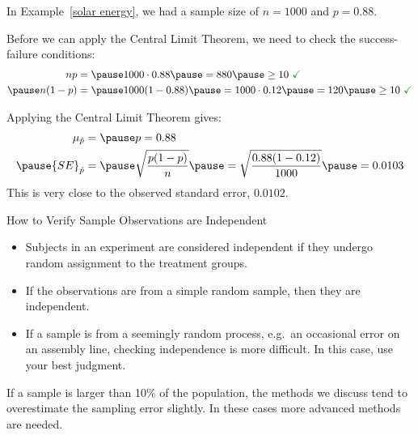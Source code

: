 \documentclass{beamer}
\begin{document}
\begin{frame}
  \begin{example}\label{solar CLT}
    \vspace{-2mm}%
    In Example~\ref{solar energy}, we had a sample size of $n=1000$ and $p=0.88$.\pause

    \vspace{1mm}
    Before we can apply the Central Limit Theorem, we need to check the success-failure conditions:
    \begin{equation*}
      \begin{aligned}
        np &= \pause
        1000\cdot 0.88\pause
        = 880\pause
        \geq 10~{\color{green!70!black}\checkmark} \\\pause
        n(1-p) &= \pause
        1000(1-0.88)\pause
        = 1000\cdot 0.12\pause
        = 120\pause
        \geq 10~{\color{green!70!black}\checkmark}
      \end{aligned}
    \end{equation*}\pause

    Applying the Central Limit Theorem gives:
    \begin{equation*}
      \begin{aligned}
        \mu_{\hat{p}} &=\pause
        p = 0.88 \\\pause
        {SE}_{\hat{p}} &= \pause
        \sqrt{\dfrac{p(1-p)}{n}}\pause
        = \sqrt{\dfrac{0.88(1-0.12)}{1000}}\pause
        = 0.0103
      \end{aligned}
    \end{equation*}\pause
    This is very close to the observed standard error, $0.0102$.
  \end{example}
\end{frame}

\begin{frame}
  \begin{block}{How to Verify Sample Observations are Independent}
    \begin{itemize}
    \item Subjects in an experiment are considered independent if they undergo random assignment to the treatment groups.\pause
    \item If the observations are from a simple random sample, then they are independent.\pause
    \item If a sample is from a seemingly random process, e.g.\  an occasional error on an assembly line, checking independence is more difficult. In this case, use your best judgment.
    \end{itemize}
  \end{block}\pause

  \begin{note}
    If a sample is larger than 10\% of the population, the methods we discuss tend to overestimate the sampling error slightly. In these cases more advanced methods are needed.
  \end{note}
\end{frame}
\end{document}
